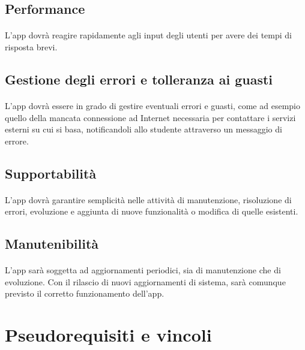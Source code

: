 \subsection{Performance}
\paragraph{}
L’app dovrà reagire rapidamente agli input degli utenti per avere dei tempi di risposta brevi.

\subsection{Gestione degli errori e tolleranza ai guasti}
\paragraph{}
L’app dovrà essere in grado di gestire eventuali errori e guasti, come ad esempio quello della mancata connessione ad Internet necessaria per contattare i servizi esterni su cui si basa, notificandoli allo studente attraverso un messaggio di errore. 

\subsection{Supportabilità}
\paragraph{}
L’app dovrà garantire semplicità nelle attività di manutenzione, risoluzione di errori, evoluzione e aggiunta di nuove funzionalità o modifica di quelle esistenti.

\subsection{Manutenibilità}
\paragraph{}
L’app sarà soggetta ad aggiornamenti periodici, sia di manutenzione che di evoluzione. Con il rilascio di nuovi aggiornamenti di sistema, sarà comunque previsto il corretto funzionamento dell’app. 


\newpage
\section{Pseudorequisiti e vincoli}

